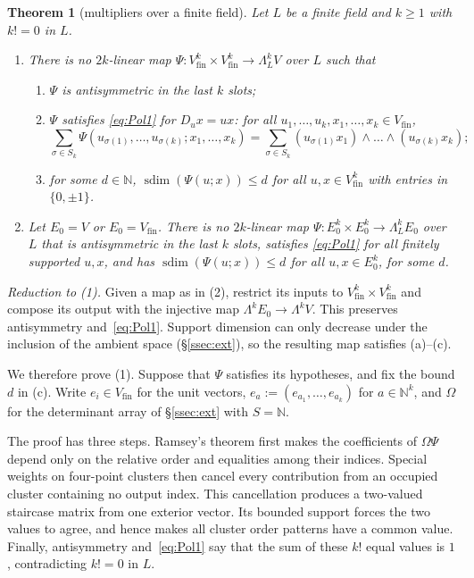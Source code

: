 \documentclass[11pt]{amsart}
\newtheorem{theorem}{Theorem}[section]
\theoremstyle{definition}
\theoremstyle{remark}
\numberwithin{equation}{section}
\newcommand{\N}{\mathbb N}
\newcommand{\sdim}{\operatorname{sdim}}
\begin{document}
\begin{samepage}
\begin{theorem}[multipliers over a finite field]\label{thm:FF}
Let $L$ be a finite field and $k\ge1$ with $k!=0$ in $L$.
\begin{enumerate}
\item There is no $2k$\nobreakdash-linear map $\Psi\colon V_{\mathrm{fin}}^k\times V_{\mathrm{fin}}^k\to\Lambda^k_LV$ over $L$ such that
\begin{enumerate}
\item $\Psi$ is antisymmetric in the last $k$ slots;
\item $\Psi$ satisfies \eqref{eq:Pol1} for $D_ux=ux$: for all $u_1,\dots,u_k,x_1,\dots,x_k\in V_{\mathrm{fin}}$,
\[
\sum_{\sigma\in S_k}\Psi(u_{\sigma(1)},\dots,u_{\sigma(k)};x_1,\dots,x_k)=\sum_{\sigma\in S_k}(u_{\sigma(1)}x_1)\wedge\dots\wedge(u_{\sigma(k)}x_k);
\]
\item for some $d\in\N$, $\sdim(\Psi(u;x))\le d$ for all $u,x\in V_{\mathrm{fin}}^k$ with entries in $\{0,\pm1\}$.
\end{enumerate}
\item Let $E_0=V$ or $E_0=V_{\mathrm{fin}}$. There is no $2k$\nobreakdash-linear map $\Psi\colon E_0^k\times E_0^k\to\Lambda^k_LE_0$ over $L$
that is antisymmetric in the last $k$ slots, satisfies \eqref{eq:Pol1} for all finitely supported $u,x$, and has
$\sdim(\Psi(u;x))\le d$ for all $u,x\in E_0^k$, for some $d$.
\end{enumerate}
\end{theorem}
\end{samepage}

\emph{Reduction to (1).} Given a map as in (2), restrict its inputs to
$V_{\mathrm{fin}}^k\times V_{\mathrm{fin}}^k$ and compose its output with the injective map
$\Lambda^kE_0\to\Lambda^kV$. This preserves antisymmetry and~\eqref{eq:Pol1}. Support dimension can only decrease under
the inclusion of the ambient space (\S\ref{ssec:ext}), so the resulting map satisfies (a)--(c).

We therefore prove (1). Suppose that $\Psi$ satisfies its hypotheses, and fix the bound $d$ in (c). Write
$e_i\in V_{\mathrm{fin}}$ for the unit vectors, $e_a:=(e_{a_1},\dots,e_{a_k})$ for $a\in\N^k$, and $\Omega$ for the
determinant array of \S\ref{ssec:ext} with $S=\N$.

The proof has three steps. Ramsey's theorem first makes the coefficients of $\Omega\Psi$ depend only on the relative
order and equalities among their indices. Special weights on four-point clusters then cancel every contribution
from an occupied cluster containing no output index. This cancellation produces a two-valued staircase matrix from
one exterior vector. Its bounded support forces the two values to agree, and hence makes all cluster order patterns
have a common value. Finally, antisymmetry and~\eqref{eq:Pol1} say that the sum of these $k!$ equal values is $1$,
contradicting $k!=0$ in $L$.
\end{document}
